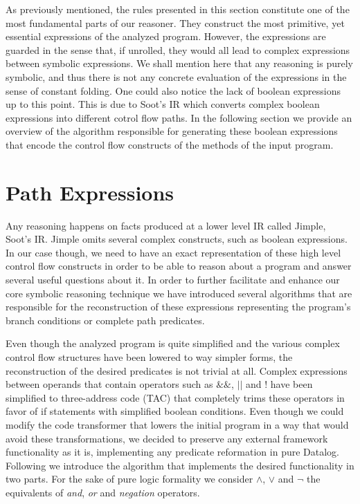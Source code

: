 As previously mentioned, the rules presented in this section constitute
one of the most fundamental parts of our reasoner. They construct the
most primitive, yet essential expressions of the analyzed program. However,
the expressions are guarded in the sense that, if unrolled, they would all
lead to complex expressions between symbolic expressions. We shall mention
here that any reasoning is purely symbolic, and thus there is not any concrete
evaluation of the expressions in the sense of constant folding. One could also
notice the lack of boolean expressions up to this point. This
is due to Soot's IR which converts complex boolean expressions into different
cotrol flow paths. In the following section we provide an overview of
the algorithm responsible for generating these boolean expressions that encode
the control flow constructs of the methods of the input program.

\section{Path Expressions}\label{s:paths}

Any \doop{} reasoning happens on facts produced at a lower level IR
called Jimple, Soot's IR. Jimple omits several complex constructs,
such as boolean expressions. In our case though, we need to have an exact
representation of these high level control flow constructs in order to be
able to reason about a program and answer several useful questions about
it. In order to further facilitate and enhance our core symbolic reasoning
technique we have introduced several algorithms that are responsible for the
reconstruction of these expressions representing the program's branch
conditions or complete path predicates.


Even though the analyzed program is quite simplified and the various complex
control flow structures have been lowered to way simpler forms, the reconstruction
of the desired predicates is not trivial at all. Complex expressions between operands
that contain operators such as $\&\&$, $||$ and $!$ have been simplified
to three-address code (TAC) that completely trims these operators in favor of
if statements with simplified boolean conditions. Even though we could modify
the code transformer that lowers the initial program in a way that would avoid these
transformations, we decided to preserve any external framework functionality as
it is, implementing any predicate reformation in pure Datalog. Following
we introduce the algorithm that implements the desired functionality in two parts.
For the sake of pure logic formality we consider $\land$, $\lor$ and $\neg$ the equivalents of
\emph{and}, \emph{or} and \emph{negation} operators.


